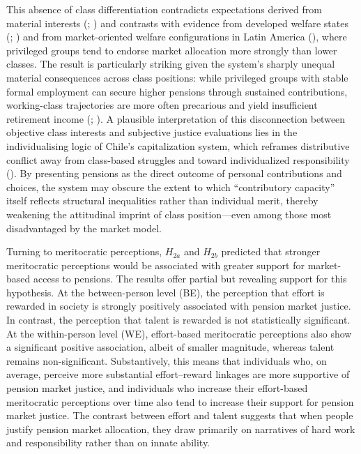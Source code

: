 \documentclass[
  12pt,
]{article}
\begin{document}
This absence of class differentiation contradicts expectations derived
from material interests (;
) and contrasts with
evidence from developed welfare states
(;
) and from market-oriented
welfare configurations in Latin America
(), where privileged
groups tend to endorse market allocation more strongly than lower
classes. The result is particularly striking given the system's sharply
unequal material consequences across class positions: while privileged
groups with stable formal employment can secure higher pensions through
sustained contributions, working-class trajectories are more often
precarious and yield insufficient retirement income
(;
). A
plausible interpretation of this disconnection between objective class
interests and subjective justice evaluations lies in the individualising
logic of Chile's capitalization system, which reframes distributive
conflict away from class-based struggles and toward individualized
responsibility (). By presenting pensions as the direct outcome of
personal contributions and choices, the system may obscure the extent to
which ``contributory capacity'' itself reflects structural inequalities
rather than individual merit, thereby weakening the attitudinal imprint
of class position---even among those most disadvantaged by the market
model.

Turning to meritocratic perceptions, \(H_{2a}\) and \(H_{2b}\) predicted
that stronger meritocratic perceptions would be associated with greater
support for market-based access to pensions. The results offer partial
but revealing support for this hypothesis. At the between-person level
(BE), the perception that effort is rewarded in society is strongly
positively associated with pension market justice. In contrast, the
perception that talent is rewarded is not statistically significant. At
the within-person level (WE), effort-based meritocratic perceptions also
show a significant positive association, albeit of smaller magnitude,
whereas talent remains non-significant. Substantively, this means that
individuals who, on average, perceive more substantial effort--reward
linkages are more supportive of pension market justice, and individuals
who increase their effort-based meritocratic perceptions over time also
tend to increase their support for pension market justice. The contrast
between effort and talent suggests that when people justify pension
market allocation, they draw primarily on narratives of hard work and
responsibility rather than on innate ability.
\end{document}
